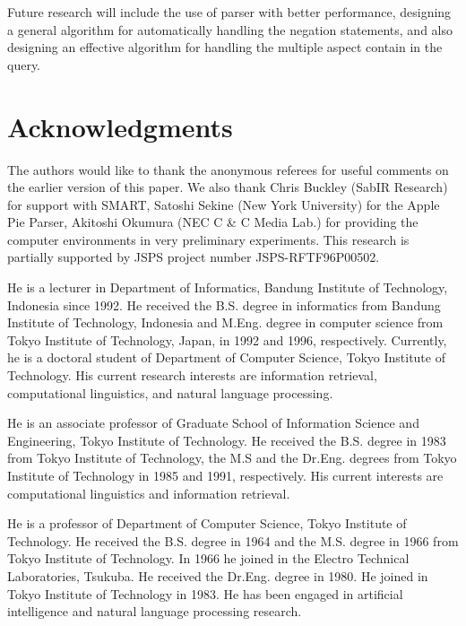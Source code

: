 Future research will include the use of parser with better performance, designing a general algorithm for automatically handling the negation statements, and also designing an effective algorithm for handling the multiple aspect contain in the query.

\section{Acknowledgments}
The authors would like to thank the anonymous referees for useful comments on the earlier version of this paper. We also thank Chris Buckley (SabIR Research) for support with SMART, Satoshi Sekine (New York University) for the Apple Pie Parser, Akitoshi Okumura (NEC C \& C Media Lab.) for providing the computer environments in very preliminary experiments.  This research is partially supported by JSPS project number JSPS-RFTF96P00502.


\NoCommaBetweenTwoAuthors




\begin{biography}

\biotitle{}

{
He is a lecturer in Department of Informatics, Bandung Institute of Technology, Indonesia since 1992.
He received the B.S. degree in informatics from Bandung Institute of Technology, Indonesia and M.Eng. degree in computer science from Tokyo Institute of Technology, Japan, in 1992 and 1996, respectively. 
Currently, he is a doctoral student of Department of Computer Science, Tokyo Institute of Technology. His current research interests are information retrieval, computational linguistics, and natural language processing.
}

{
He is an associate professor of Graduate School of Information Science and Engineering, Tokyo Institute of Technology. He received the B.S. degree in 1983 from Tokyo Institute of Technology, the M.S and the Dr.Eng. degrees from Tokyo Institute of Technology in 1985 and 1991, respectively. His current interests are computational linguistics and information retrieval.
}

{
He is a professor of Department of Computer Science, Tokyo Institute of Technology. He received the B.S. degree in 1964 and the M.S. degree in 1966 from Tokyo Institute of Technology. In 1966 he joined in the Electro Technical Laboratories, Tsukuba. He received the Dr.Eng. degree in 1980. He joined in Tokyo Institute of Technology in 1983. He has been engaged in artificial intelligence and natural language processing research.
}


\end{biography}





